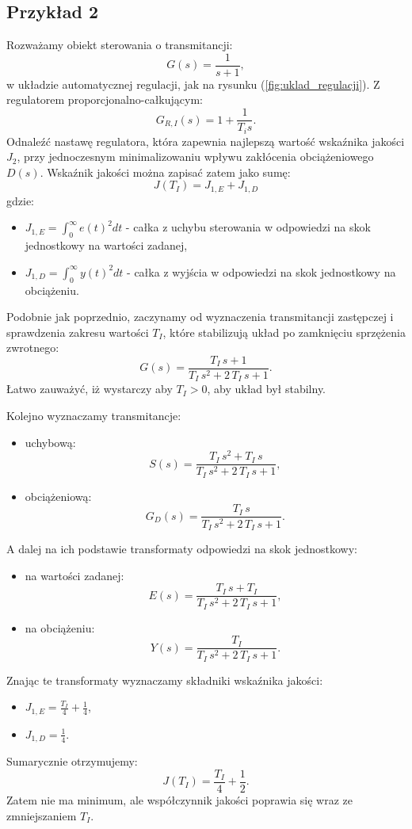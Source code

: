 \documentclass{article}
\begin{document}
    \subsection{Przykład 2}
    Rozważamy obiekt sterowania o transmitancji:
    $$
        G(s) = \frac{1}{s + 1}, 
    $$
    w układzie automatycznej regulacji, jak na rysunku (\ref{fig:uklad_regulacji}).
    Z regulatorem proporcjonalno-całkującym:
    $$
        G_{R,I}(s) = 1 + \frac{1}{T_{i}s}.
    $$
    Odnaleźć nastawę regulatora, która zapewnia najlepszą wartość wskaźnika jakości $J_{2}$, przy jednoczesnym minimalizowaniu wpływu zakłócenia obciążeniowego $D(s)$.
    Wskaźnik jakości można zapisać zatem jako sumę:
    $$
        J(T_I) = J_{1,E} + J_{1,D}
    $$
    gdzie:
    \begin{itemize}
        \item $J_{1,E} = \int_{0}^{\infty}{e(t)^2dt}$ - całka z uchybu sterowania w odpowiedzi na skok jednostkowy na wartości zadanej,
        \item $J_{1,D} = \int_{0}^{\infty}{y(t)^2dt}$ - całka z wyjścia w odpowiedzi na skok jednostkowy na obciążeniu.
    \end{itemize}


    Podobnie jak poprzednio, zaczynamy od wyznaczenia transmitancji zastępczej i sprawdzenia zakresu wartości $T_{I}$, które stabilizują układ po zamknięciu sprzężenia zwrotnego:
    $$
        G(s)
        =
        \frac{T_{I}\,s+1}{T_{I}\,s^2+2\,T_{I}\,s+1}.
    $$
    Łatwo zauważyć, iż wystarczy aby $T_{I} > 0$, aby układ był stabilny.

    Kolejno wyznaczamy transmitancje:
    \begin{itemize}
        \item uchybową:
        $$
            S(s) = \frac{T_{I}\,s^2+T_{I}\,s}{T_{I}\,s^2+2\,T_{I}\,s+1},
        $$
        \item obciążeniową:
        $$
            G_{D}(s) = \frac{T_{I}\,s}{T_{I}\,s^2+2\,T_{I}\,s+1}.
        $$
    \end{itemize}
    A dalej na ich podstawie transformaty odpowiedzi na skok jednostkowy:
    \begin{itemize}
        \item na wartości zadanej:
        $$
            E(s) = \frac{T_{I}\,s+T_{I}}{T_{I}\,s^2+2\,T_{I}\,s+1},
        $$
        \item na obciążeniu:
        $$
            Y(s) = \frac{T_{I}}{T_{I}\,s^2+2\,T_{I}\,s+1}.
        $$
    \end{itemize}
    Znając te transformaty wyznaczamy składniki wskaźnika jakości:
    \begin{itemize}
        \item $J_{1,E} = \frac{T_{I}}{4}+\frac{1}{4}$,
        \item $J_{1,D} = \frac{1}{4}$.
    \end{itemize}
    Sumarycznie otrzymujemy:
    $$
        J(T_I) = \frac{T_{I}}{4}+\frac{1}{2}.
    $$
    Zatem nie ma minimum, ale współczynnik jakości poprawia się wraz ze zmniejszaniem $T_I$. 
\end{document}
